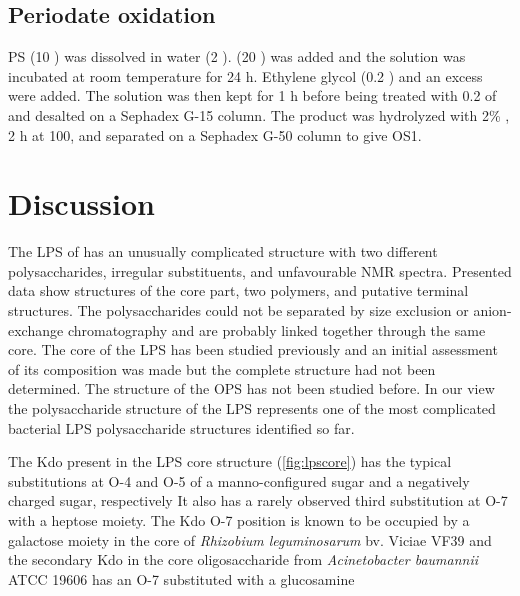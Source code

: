 	\subsection{Periodate oxidation} %
	\label{sub:periodate_oxidation}

		 \ac{PS} (10 \milligram) was dissolved in water (2 \millilitre).  (20 \milligram) was added and the solution was incubated at room temperature for 24 h. Ethylene glycol (0.2 \millilitre) and an excess  were added. The solution was then kept for 1 h before being treated with 0.2 \millilitre of  and desalted on a Sephadex G-15 column. The product was hydrolyzed with 2\% , 2 h at 100\cel, and  separated on a Sephadex G-50 column to give \ac{OS}1.


\section{Discussion} %
\label{sec:discussion}

	The \ac{LPS} of \caulobacter has an unusually complicated structure with two different polysaccharides, irregular substituents, and unfavourable \ac{NMR} spectra. Presented data show structures of the core part, two polymers, and putative terminal structures. The polysaccharides could not be separated by size exclusion or anion-exchange chromatography and are probably linked together through the same core. The core of the \caulobacter{} \ac{LPS} has been studied previously and an initial assessment of its composition was made but the complete structure had not been determined. The structure of the \ac{OPS} has not been studied before. In our view the polysaccharide structure of the \caulobacter{} \ac{LPS} represents one of the most complicated bacterial \ac{LPS} polysaccharide structures identified so far.

	The Kdo present in the \ac{LPS} core structure (\cref{fig:lpscore}) has the typical substitutions at O-4 and O-5 of a manno-configured sugar and a negatively charged sugar, respectively It also has a rarely observed third substitution at O-7 with a heptose moiety. The Kdo O-7 position is known to be occupied by a galactose moiety in the core of \textit{Rhizobium leguminosarum} bv. Viciae VF39 and the secondary Kdo in the core oligosaccharide from \textit{Acinetobacter baumannii} ATCC 19606 has an O-7 substituted with a glucosamine


